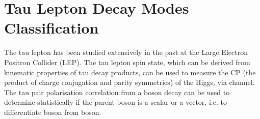 \chapter{Tau Lepton Decay Modes Classification}
\label{chap:Tau}

%
{}%

The tau lepton has been studied extensively in the past at the Large Electron Positron Collider (LEP)\cite{Schael:2005am}. The tau lepton spin state, which can be derived from kinematic properties of tau decay products, can be used to measure the CP (the product of charge conjugation and parity symmetries) of the Higgs, via \HiggsToTauTau channel\cite{Berge:2015nua}. The tau pair polarisation correlation from a boson decay can be used to determine statistically if the parent boson is a  scalar or a vector, i.e. to differentiate \PH boson from \PZ boson.


